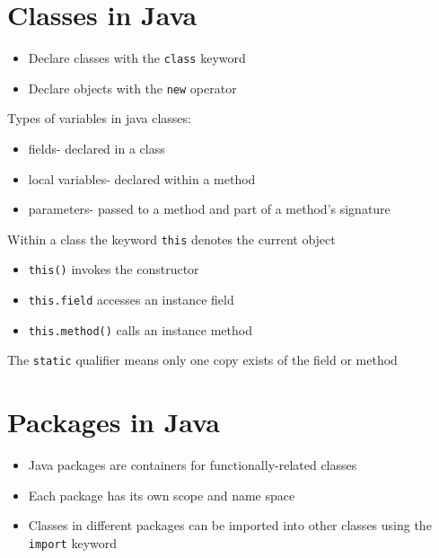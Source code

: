 \documentclass{article}
\begin{document}
\section{Classes in Java}
\begin{itemize}
    \item Declare classes with the \texttt{class} keyword
    \item Declare objects with the \texttt{new} operator
\end{itemize}
Types of variables in java classes:
\begin{itemize}
    \item fields- declared in a class
    \item local variables- declared within a method
    \item parameters- passed to a method and part of a method's signature
\end{itemize}
Within a class the keyword \texttt{this} denotes the current object
\begin{itemize}
    \item \texttt{this()} invokes the constructor
    \item \texttt{this.field} accesses an instance field
    \item \texttt{this.method()} calls an instance method
\end{itemize}
The \texttt{static} qualifier means only one copy exists of the field or method

\section{Packages in Java}
\begin{itemize}
    \item Java packages are containers for functionally-related classes
    \item Each package has its own scope and name space
    \item Classes in different packages can be imported into other classes using the \texttt{import} keyword
    
\end{itemize}
\end{document}
